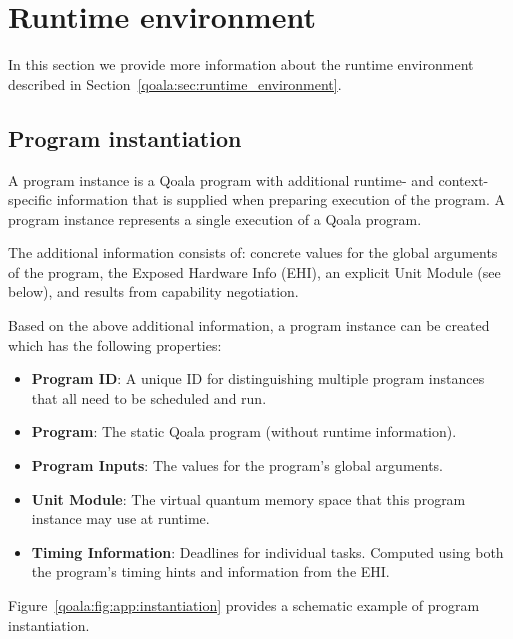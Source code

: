 \section{Runtime environment}
\label{qoala:sec:app:runtime_environment}
In this section we provide more information about the runtime environment described in Section~\ref{qoala:sec:runtime_environment}.

\subsection{Program instantiation}
A program instance is a Qoala program with additional runtime- and context-specific information that is supplied when preparing execution of the program.
A program instance represents a single execution of a Qoala program.

The additional information consists of:
concrete values for the global arguments of the program,
the Exposed Hardware Info (EHI),
an explicit Unit Module (see below), and
results from capability negotiation.

Based on the above additional information, a program instance can be created which has the following properties:
\begin{itemize}
\item \textbf{Program ID}: A unique ID for distinguishing multiple program instances that all need to be scheduled and run.
\item \textbf{Program}: The static Qoala program (without runtime information).
\item \textbf{Program Inputs}: The values for the program's global arguments.
\item \textbf{Unit Module}: The virtual quantum memory space that this program instance may use at runtime.
\item \textbf{Timing Information}: Deadlines for individual tasks. Computed using both the program's timing hints and information from the EHI.
\end{itemize}

Figure~\ref{qoala:fig:app:instantiation} provides a schematic example of program instantiation.


